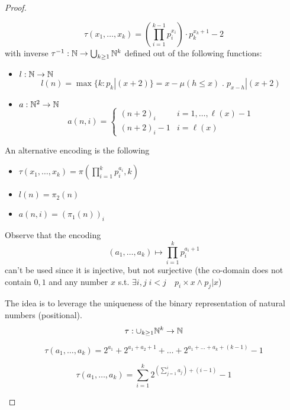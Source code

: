 \begin{lemma}
\begin{proof}
\begin{enumerate}[label=(\arabic*)]
{    \[
    \tau(x_1, \dots, x_k) = \left(\prod_{i=1}^{k-1}p_i^{x_i}\right) \cdot p_k^{x_k+1} - 2
    \]
    with inverse $\tau^{-1} : \mathbb{N} \to \bigcup_{k \geq 1} \mathbb{N}^k$ defined out of the following functions:
    \begin{itemize}
      \item $l :\mathbb{N} \to \mathbb{N}$
            \[
            l(n) =   \max\{k : p_k | (x+2)\} = x - \mu (h \leq x) \;
            . \; p_{x-h} | (x+2)
            \]
      \item $a :\mathbb{N}^2 \to \mathbb{N}$
            \[
              a(n,i)=\begin{cases}
                (n+2)_i & i = 1, \dots, \ell(x)-1 \\
                (n+2)_i - 1 & i = \ell(x)
              \end{cases}
              \]
    \end{itemize}
    An alternative encoding is the following
    \begin{itemize}
      \item $\tau(x_1, \dots, x_k) = \pi(\prod_{i=1}^k p_i^{a_i}, k)$
      \item $l(n) = \pi_2(n)$
      \item $a(n,i) = (\pi_1(n))_i$
    \end{itemize}
      
    
    
    
    
    
    
    
    
    
    
    
    
    
    
    
    
    \iffalse
    Observe that the encoding
        \[(a_1, \dots, a_k) \mapsto \prod^k_{i=1}p_i^{a_i+1}\] can't
        be used since it is injective, but not surjective (the
        co-domain does not contain $0,1$ and any number $x$
        s.t. \(\exists i,j \; i<j \quad p_i \times x \wedge p_j | x\))

        The idea is to leverage the uniqueness of the binary
        representation of natural numbers (positional).
        \[\tau : \cup_{k \geq 1} \mathbb{N}^k \to \mathbb{N} \]

        \[\tau (a_1, \dots, a_k ) = 2^{a_1}+2^{a_1+a_2+1}+ \dots +
          2^{a_1+\dots + a_k + (k-1)} - 1\]

        \[\tau (a_1, \dots, a_k ) = \sum^k_{i=1}2^{(\sum_{j=1}^i a_j)
            + (i-1)}-1\]

}
\end{enumerate}
\end{proof}
\end{lemma}
